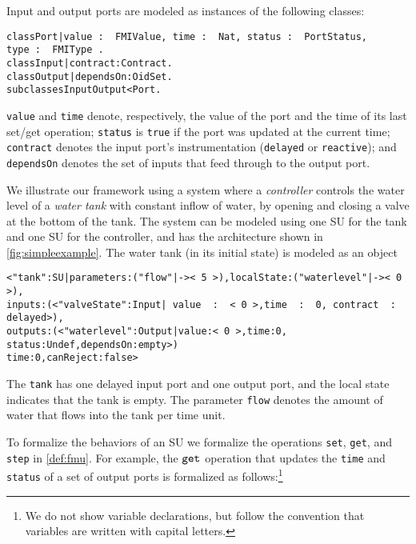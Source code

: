 Input and output ports are modeled as  instances of the following
classes:

\small
\begin{alltt}
class Port | value\,:\,\,FMIValue,\,time\,:\,\,Nat,\,status\,:\,\,PortStatus,\,type\,:\,\,FMIType\,. 
class Input | contract : Contract .
class Output | dependsOn : OidSet .     
subclasses Input Output < Port .
\end{alltt}
\normalsize

\noindent %
\texttt{value} and \texttt{time} denote, respectively, the
value of the port and the time of its last set/get operation; 
\texttt{status} is \texttt{true}  if the port was
updated  at the current time;   \texttt{contract} denotes the
input port's instrumentation (\texttt{delayed} or
\texttt{reactive}); and 
\texttt{dependsOn} denotes the set of inputs that feed
through to the output port. 

\begin{example}
  We illustrate our  framework using a system where a
\emph{controller} 
controls the water level of a \emph{water tank} with constant inflow
of water,  by opening and closing a valve
at the bottom of the tank. 
The system can be modeled using  one SU for the tank and one SU for
the controller, and has the architecture shown in
\cref{fig:simpleexample}.
%
The water tank  (in its initial state)  is modeled as an object
  
\scriptsize
\begin{alltt}
< "tank" : SU | parameters : ("flow" |-> <\,5\,>),  localState : ("waterlevel" |-> <\,0\,>),
                inputs : (< "valveState" : Input |\,value\,\,:\,\,<\,0\,>, time\,\,:\,\,0,\,contract\,\,:\,\,delayed >),
                outputs : (< "waterlevel" : Output | value : <\,0\,>, time : 0,
                                                     status : Undef, dependsOn : empty >)
                time : 0,  canReject : false >
\end{alltt}
\normalsize

\noindent The \texttt{tank} has one delayed input port and one output
port, and the local state indicates that the tank is empty.  
The parameter \texttt{flow} denotes the amount of water that flows
into the tank per time unit.
\end{example}

To formalize the behaviors of an SU we formalize the operations
\texttt{set}, \texttt{get}, and \texttt{step} in
\cref{def:fmu}. 
For example, the $\mathtt{get}_{}$ operation that updates the \texttt{time}
and \texttt{status}  of a set
of output ports is formalized as follows:\footnote{We do not show
  variable declarations, but follow the convention that variables are
  written with capital letters.} 


